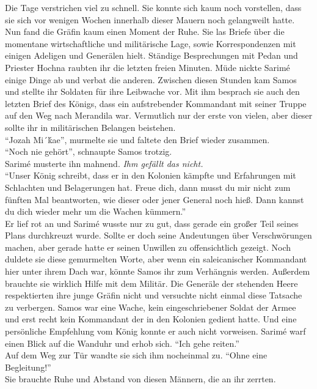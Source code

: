 Die Tage verstrichen viel zu schnell. Sie konnte sich kaum noch vorstellen, dass sie sich vor 
wenigen Wochen innerhalb dieser Mauern noch gelangweilt hatte. Nun fand die Gräfin kaum einen 
Moment der Ruhe. Sie las Briefe über die momentane wirtschaftliche und militärische Lage, sowie 
Korrespondenzen mit einigen Adeligen und Generälen hielt. Ständige Besprechungen mit Pedan 
und Priester Hochna raubten ihr die letzten freien Minuten. Müde nickte Sarimé einige Dinge ab und 
verbat die anderen. Zwischen diesen Stunden kam Samos und stellte ihr Soldaten für ihre 
Leibwache vor. Mit ihm besprach sie auch den letzten Brief des Königs, dass ein aufstrebender 
Kommandant mit seiner Truppe auf den Weg nach Merandila war. Vermutlich nur der erste von vielen, 
aber dieser sollte ihr in militärischen Belangen beistehen. \\
``Jozah Mi´ḱae'', murmelte sie und faltete den Brief wieder zusammen.\\
``Noch nie gehört'', schnaupte Samos trotzig.\\
Sarimé musterte ihn mahnend. \textit{Ihm gefällt das nicht.}\\
``Unser König schreibt, dass er in den Kolonien kämpfte und Erfahrungen mit Schlachten und 
Belagerungen hat. Freue dich, dann musst du mir nicht zum fünften Mal beantworten, wie dieser oder 
jener General noch hieß. Dann kannst du dich wieder mehr um die Wachen kümmern.''\\
Er lief rot an und Sarimé wusste nur zu gut, dass gerade ein großer Teil seines Plans durchkreuzt 
wurde. Sollte er doch seine Andeutungen über Verschwörungen machen, aber gerade hatte er seinen 
Unwillen zu offensichtlich gezeigt. Noch duldete sie diese gemurmelten Worte, aber wenn ein 
saleicanischer Kommandant hier unter ihrem Dach war, könnte Samos ihr zum Verhängnis werden. 
Außerdem brauchte sie wirklich Hilfe mit dem Militär. Die Generäle der stehenden Heere respektierten 
ihre junge Gräfin nicht und versuchte nicht einmal diese Tatsache zu verbergen. Samos war eine 
Wache, kein eingeschriebener Soldat der Armee und erst recht kein Kommandant der in den Kolonien 
gedient hatte. Und eine persönliche Empfehlung vom König konnte er auch nicht vorweisen. Sarimé warf 
einen Blick auf die Wanduhr und erhob sich. ``Ich gehe reiten.''\\
Auf dem Weg zur Tür wandte sie sich ihm nocheinmal zu. ``Ohne eine Begleitung!''\\
Sie brauchte Ruhe und Abstand von diesen Männern, die an ihr zerrten. \\

